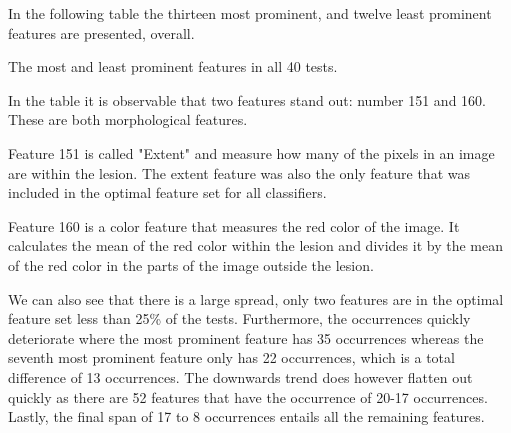 \documentclass{kththesis}
\begin{document}
In the following table the thirteen most prominent, and twelve least prominent features are presented, overall. 



\begin{table}[h!]
  \begin{center}
    \caption{The most and least prominent features in all 40 tests.}
  \end{center}
\end{table}
\newpage
In the table it is observable that two features stand out: number 151 and 160. These are both morphological features.%

Feature 151 is called "Extent" and measure how many of the pixels in an image are within the lesion.
The extent feature was also the only feature that was included in the optimal feature set for all classifiers.

Feature 160 is a color feature that measures the red color of the image. It calculates the mean of the red color within the lesion and divides it by the mean of the red color in the parts of the image outside the lesion.

We can also see that there is a large spread, only two features are in the optimal feature set less than 25\% of the tests. Furthermore, the occurrences quickly deteriorate where the most prominent feature has 35 occurrences whereas the seventh most prominent feature only has 22 occurrences, which is a total difference of 13 occurrences. The downwards trend does however flatten out quickly as there are 52 features that have the occurrence of 20-17 occurrences. Lastly, the final span of 17 to 8 occurrences entails all the remaining features. 
\end{document}
